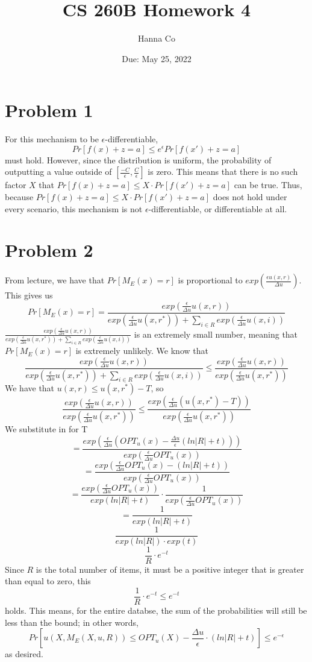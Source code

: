 \documentclass[12pt, letterpaper]{article}
\title{CS 260B Homework 4}
\author{Hanna Co}
\affil{Collaborators: Isha Gonugunta}
\date{Due: May 25, 2022}
\begin{document}
\maketitle
\newpage
\section{Problem 1}
For this mechanism to be $\epsilon$-differentiable,
\[Pr[f(x)+z=a]\leq e^{\epsilon}Pr[f(x')+z=a]\]
must hold. However, since the distribution is uniform, the probability of outputting a value outside of $[\frac{-C}{\epsilon},\frac{C}{\epsilon}]$ is zero. This means that there is no such factor $X$ that $Pr[f(x)+z=a]\leq X\cdot Pr[f(x')+z=a]$ can be true. Thus, because $Pr[f(x)+z=a]\leq X\cdot Pr[f(x')+z=a]$ does not hold under every scenario, this mechanism is not $\epsilon$-differentiable, or differentiable at all.

\newpage
\section{Problem 2}
From lecture, we have that $Pr[M_E(x)=r]$ is proportional to $exp(\frac{\epsilon u(x,r)}{\Delta u})$. This gives us
\[Pr[M_E(x)=r]=\frac{exp(\frac{\epsilon}{\Delta u}u(x,r))}{exp(\frac{\epsilon}{\Delta u}u(x,r^*)) + \sum_{i\in R} exp(\frac{\epsilon}{\Delta u}u(x,i))}\]
$\frac{exp(\frac{\epsilon}{\Delta u}u(x,r))}{exp(\frac{\epsilon}{\Delta u}u(x,r^*)) + \sum_{i\in R} exp(\frac{\epsilon}{\Delta u}u(x,i))}$ is an extremely small number, meaning that $Pr[M_E(x)=r]$ is extremely unlikely.  We know that
\[\frac{exp(\frac{\epsilon}{\Delta u}u(x,r))}{exp(\frac{\epsilon}{\Delta u}u(x,r^*)) + \sum_{i\in R} exp(\frac{\epsilon}{\Delta u}u(x,i))} \leq \frac{exp(\frac{\epsilon}{\Delta u}u(x,r))}{exp(\frac{\epsilon}{\Delta u}u(x,r^*))}\]
We have that $u(x,r)\leq u(x,r^*)-T$, so
\[\frac{exp(\frac{\epsilon}{\Delta u}u(x,r))}{exp(\frac{\epsilon}{\Delta u}u(x,r^*))}\leq \frac{exp(\frac{\epsilon }{\Delta u}(u(x,r^*)-T))}{exp(\frac{\epsilon}{\Delta u}u(x,r^*))}\]
We substitute in for T
\[= \frac{exp(\frac{\epsilon}{\Delta u}(OPT_u(x)-\frac{\Delta u}{\epsilon}(ln\lvert R\rvert +t)))}{exp(\frac{\epsilon}{\Delta u}OPT_u(x))}\]
\[= \frac{exp(\frac{\epsilon}{\Delta u}OPT_u(x)-(ln\lvert R\rvert +t))}{exp(\frac{\epsilon}{\Delta u}OPT_u(x))}\]
\[=\frac{exp(\frac{\epsilon}{\Delta u}OPT_u(x))}{exp(ln\lvert R\rvert + t)}\cdot\frac{1}{exp(\frac{\epsilon}{\Delta u}OPT_u(x))}\]
\[=\frac{1}{exp(ln\lvert R\rvert + t)}\]
\[\frac{1}{exp(ln\lvert R\rvert)\cdot exp(t)}\]
\[\frac{1}{R}\cdot e^{-t}\]
Since $R$ is the total number of items, it must be a positive integer that is greater than equal to zero, this 
\[\frac{1}{R}\cdot e^{-t}\leq e^{-t}\]
holds. This means, for the entire databse, the sum of the probabilities will still be less than the bound; in other words,
\[Pr[u(X, M_E(X,u,R))\leq OPT_u(X)-\frac{\Delta u}{\epsilon}\cdot(ln\lvert R\rvert+t)]\leq e^{-\epsilon}\]
as desired.
\end{document}

